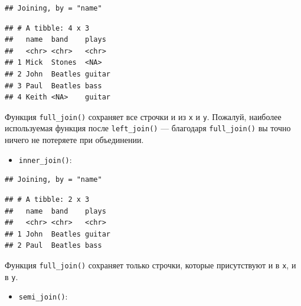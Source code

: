 \documentclass[
]{book}
\newenvironment{Shaded}{\begin{snugshade}}{\end{snugshade}}
\newcommand{\KeywordTok}[1]{\textcolor[rgb]{0.13,0.29,0.53}{\textbf{#1}}}
\newcommand{\NormalTok}[1]{#1}
\newcommand{\OperatorTok}[1]{\textcolor[rgb]{0.81,0.36,0.00}{\textbf{#1}}}
\newcommand{\StringTok}[1]{\textcolor[rgb]{0.31,0.60,0.02}{#1}}
\providecommand{\tightlist}{%
  \setlength{\itemsep}{0pt}\setlength{\parskip}{0pt}}
\begin{document}
\begin{verbatim}
## Joining, by = "name"
\end{verbatim}

\begin{verbatim}
## # A tibble: 4 x 3
##   name  band    plays 
##   <chr> <chr>   <chr> 
## 1 Mick  Stones  <NA>  
## 2 John  Beatles guitar
## 3 Paul  Beatles bass  
## 4 Keith <NA>    guitar
\end{verbatim}

Функция \texttt{full\_join()} сохраняет все строчки и из \texttt{x} и \texttt{y}. Пожалуй, наиболее используемая функция после \texttt{left\_join()} --- благодаря \texttt{full\_join()} вы точно ничего не потеряете при объединении.

\begin{itemize}
\tightlist
\item
  \texttt{inner\_join()}:
\end{itemize}

\begin{Shaded}
\end{Shaded}

\begin{verbatim}
## Joining, by = "name"
\end{verbatim}

\begin{verbatim}
## # A tibble: 2 x 3
##   name  band    plays 
##   <chr> <chr>   <chr> 
## 1 John  Beatles guitar
## 2 Paul  Beatles bass
\end{verbatim}

Функция \texttt{full\_join()} сохраняет только строчки, которые присутствуют и в \texttt{x}, и в \texttt{y}.

\begin{itemize}
\tightlist
\item
  \texttt{semi\_join()}:
\end{itemize}

\begin{Shaded}
\end{Shaded}
\end{document}
